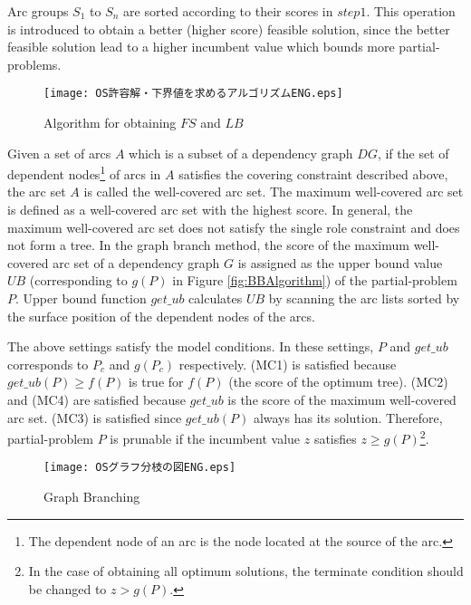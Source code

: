 Arc groups $S_1$ to $S_n$ are sorted according to their scores in $step1$. This operation is introduced to obtain a better (higher score) feasible solution, since the better feasible solution lead to a higher incumbent value which bounds more partial-problems. 

\begin{figure}[t]
 \begin{center} 
    \texttt{[image: OS許容解・下界値を求めるアルゴリズムENG.eps]}
 \end{center}
\myfiglabelskippre
\caption{Algorithm for obtaining $FS$ and $LB$}
\label{fig:AlgorithmForLPi}
\end{figure}

\mygapskip{}

Given a set of arcs $A$ which is a subset of a dependency graph $DG$,
if the set of dependent nodes\footnote{The dependent node of an arc
is the node located at the source of the arc.} of arcs in $A$
satisfies the covering constraint described above, the arc set $A$ is
called the well-covered arc set. The maximum well-covered arc set is
defined as a well-covered arc set with the highest score. In general,
the maximum well-covered arc set does not satisfy the single role
constraint and does not form a tree. In the graph branch method, the
score of the maximum well-covered arc set of a dependency graph $G$ is
assigned as the upper bound value $UB$ (corresponding to $g(P)$ in
Figure \ref{fig:BBAlgorithm}) of the partial-problem $P$. Upper bound
function $get\_ub$ calculates $UB$ by scanning the arc lists sorted by
the surface position of the dependent nodes of the arcs.

The above settings satisfy the model conditions. In these settings, $P$
and $get\_ub$ corresponds to $P_c$ and $g(P_c)$ respectively. (MC1) is
satisfied because $get\_ub(P){\geq}f(P)$ is true for $f(P)$ (the score
of the optimum tree). (MC2) and (MC4) are satisfied because $get\_ub$ is
the score of the maximum well-covered arc set. (MC3) is satisfied
since $get\_ub(P)$ always has its solution. Therefore, partial-problem
$P$ is prunable if the incumbent value $z$ satisfies $z{\geq}g(P)$\footnote{In the case of obtaining all optimum solutions, the terminate
condition should be changed to $z>g(P)$.}.

\mygapskip{}

\begin{figure}[b]
 \begin{center}
      \texttt{[image: OSグラフ分枝の図ENG.eps]}
 \end{center}
\myfiglabelskippre
\caption{Graph Branching}
\label{fig:GraphBranching}
\end{figure}

